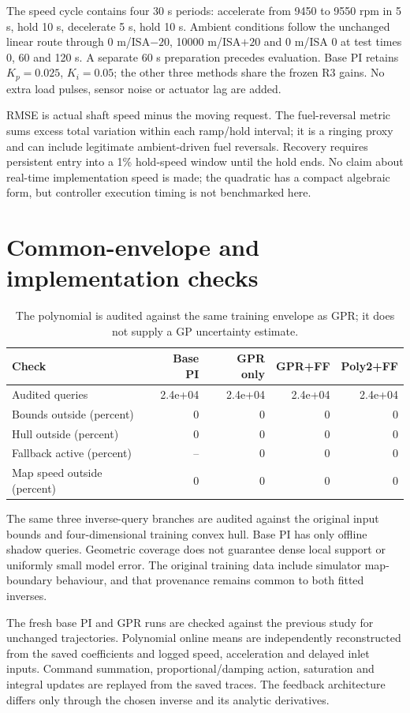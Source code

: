 \documentclass[11pt,a4paper]{article}
\begin{document}
The speed cycle contains four 30 s periods: accelerate from 9450 to 9550 rpm in 5 s, hold 10 s, decelerate 5 s, hold 10 s. Ambient conditions follow the unchanged linear route through 0 m/ISA$-20$, 10000 m/ISA$+20$ and 0 m/ISA 0 at test times 0, 60 and 120 s. A separate 60 s preparation precedes evaluation. Base PI retains $K_p=0.025$, $K_i=0.05$; the other three methods share the frozen R3 gains. No extra load pulses, sensor noise or actuator lag are added.

RMSE is actual shaft speed minus the moving request. The fuel-reversal metric sums excess total variation within each ramp/hold interval; it is a ringing proxy and can include legitimate ambient-driven fuel reversals. Recovery requires persistent entry into a 1\% hold-speed window until the hold ends. No claim about real-time implementation speed is made; the quadratic has a compact algebraic form, but controller execution timing is not benchmarked here.
\clearpage
\section{Common-envelope and implementation checks}
\begin{table}[H]\centering\small\begin{tabular}{lrrrr}\toprule
Check & Base PI & GPR only & GPR+FF & Poly2+FF\\\midrule
Audited queries & 2.4e+04 & 2.4e+04 & 2.4e+04 & 2.4e+04\\
Bounds outside (percent) & 0 & 0 & 0 & 0\\
Hull outside (percent) & 0 & 0 & 0 & 0\\
Fallback active (percent) & -- & 0 & 0 & 0\\
Map speed outside (percent) & 0 & 0 & 0 & 0\\
\bottomrule\end{tabular}\caption{The polynomial is audited against the same training envelope as GPR; it does not supply a GP uncertainty estimate.}\end{table}
The same three inverse-query branches are audited against the original input bounds and four-dimensional training convex hull. Base PI has only offline shadow queries. Geometric coverage does not guarantee dense local support or uniformly small model error. The original training data include simulator map-boundary behaviour, and that provenance remains common to both fitted inverses.

The fresh base PI and GPR runs are checked against the previous study for unchanged trajectories. Polynomial online means are independently reconstructed from the saved coefficients and logged speed, acceleration and delayed inlet inputs. Command summation, proportional/damping action, saturation and integral updates are replayed from the saved traces. The feedback architecture differs only through the chosen inverse and its analytic derivatives.
\clearpage
\end{document}
